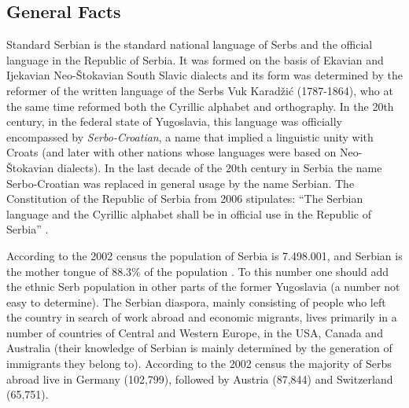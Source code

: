 \begin{multicols}{2}

\subsection{General Facts}

Standard Serbian is the standard national language of Serbs and the official language in the Republic of Serbia. It was formed on the basis of Ekavian and Ijekavian Neo-Štokavian South Slavic dialects and its form was determined by the reformer of the written language of the Serbs Vuk Karadžić (1787-1864), who at the same time reformed both the Cyrillic alphabet and orthography. In the 20th century, in the federal state of Yugoslavia, this language was officially encompassed by \textit{Serbo-Croatian}, a name that implied a linguistic unity with Croats (and later with other nations whose languages were based on Neo-Štokavian dialects).  In the last decade of the 20th century in Serbia the name Serbo-Croatian was replaced in general usage by the name Serbian. The Constitution of the Republic of Serbia from 2006 stipulates: “The Serbian language and the Cyrillic alphabet shall be in official use in the Republic of Serbia” \cite{Ustav}.

According to the 2002 census the population of Serbia is 7.498.001, \cite{VJN3} and Serbian is the mother tongue of 88.3\% of the population \cite{HDR}. To this number one should add the ethnic Serb population in other parts of the former Yugoslavia (a number not easy to determine). The Serbian diaspora, mainly consisting of people who left the country in search of work abroad and economic migrants, lives primarily in a number of countries of Central and Western Europe, in the USA, Canada and Australia (their knowledge of Serbian is mainly determined by the generation of immigrants they belong to).  According to the 2002 census the majority of Serbs abroad live in Germany (102,799), followed by Austria (87,844) and Switzerland (65,751).



\end{multicols}
